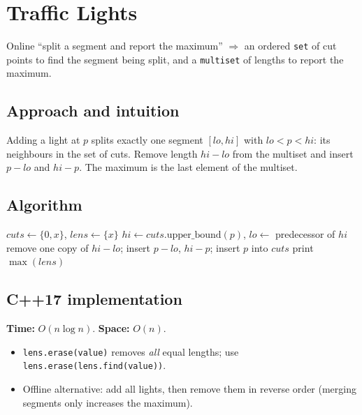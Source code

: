 \section{Traffic Lights}
\label{sec:g-traffic}


\begin{patternbox}
Online ``split a segment and report the maximum'' $\Rightarrow$ an ordered
\texttt{set} of cut points to find the segment being split, and a
\texttt{multiset} of lengths to report the maximum.
\end{patternbox}

\subsection*{Approach and intuition}

Adding a light at $p$ splits exactly one segment $[lo,hi]$ with $lo<p<hi$:
its neighbours in the set of cuts. Remove length $hi-lo$ from the multiset
and insert $p-lo$ and $hi-p$. The maximum is the last element of the
multiset.

\subsection*{Algorithm}
\begin{algorithmic}[1]
\State $cuts\gets\{0,x\}$, $lens\gets\{x\}$
  \State $hi\gets cuts.\text{upper\_bound}(p)$, $lo\gets$ predecessor of $hi$
  \State remove one copy of $hi-lo$; insert $p-lo$, $hi-p$; insert $p$ into $cuts$
  \State print $\max(lens)$
\EndFor
\end{algorithmic}


\subsection*{C++17 implementation}

\begin{complexitybox}
\textbf{Time:} $O(n\log n)$. \textbf{Space:} $O(n)$.
\end{complexitybox}

\begin{pitfallbox}
\begin{itemize}
  \item \texttt{lens.erase(value)} removes \emph{all} equal lengths; use
        \texttt{lens.erase(lens.find(value))}.
  \item Offline alternative: add all lights, then remove them in reverse
        order (merging segments only increases the maximum).
\end{itemize}
\end{pitfallbox}
